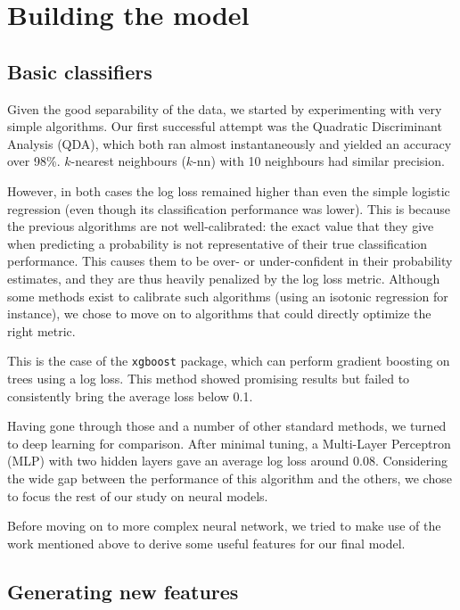 \documentclass[a4paper,11pt,openany,extrafontsizes,oneside,article,twocolumn]{memoir}
\begin{document}
\chapter{Building the model}

\section{Basic classifiers}

Given the good separability of the data, we started by experimenting
with very simple algorithms. Our first successful attempt was the
Quadratic Discriminant Analysis (QDA), which both ran almost
instantaneously and yielded an accuracy over 98\%. $k$-nearest
neighbours ($k$-nn) with 10 neighbours had similar precision.

However, in both cases the log loss remained higher than even the
simple logistic regression (even though its classification performance
was lower). This is because the previous algorithms are not
well-calibrated: the exact value that they give when predicting a
probability is not representative of their true classification
performance. This causes them to be over- or under-confident in their
probability estimates, and they are thus heavily penalized by the log
loss metric. Although some methods exist to calibrate such algorithms
(using an isotonic regression for instance), we chose to move on to
algorithms that could directly optimize the right metric.

This is the case of the \texttt{xgboost} package, which can perform
gradient boosting on trees using a log loss. This method showed
promising results but failed to consistently bring the average loss
below 0.1.

Having gone through those and a number of other standard methods, we
turned to deep learning for comparison. After minimal tuning, a
Multi-Layer Perceptron (MLP) with two hidden layers gave an average
log loss around 0.08. Considering the wide gap between the performance
of this algorithm and the others, we chose to focus the rest of our
study on neural models.

Before moving on to more complex neural network, we tried to make use
of the work mentioned above to derive some useful features for our
final model.

\section{Generating new features}
\end{document}
